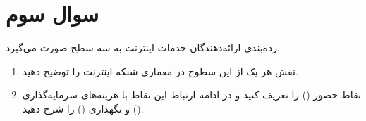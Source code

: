 \section{سوال سوم}
رده‌بندی ارائه‌دهندگان خدمات اینترنت به سه سطح  صورت می‌گیرد.

\begin{enumerate}
	\item 
	نقش هر یک از این سطوح در معماری شبکه اینترنت را توضیح دهید.
	\begin{qsolve}
		
	\end{qsolve}
	
	
	\item 
	نقاط حضور () را تعریف کنید و در ادامه ارتباط این نقاط با هزینه‌های سرمایه‌گذاری () و نگهداری () را شرح دهید.
	\begin{qsolve}
		
	\end{qsolve}
	
\end{enumerate}